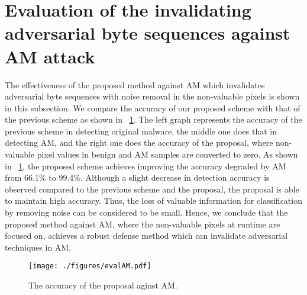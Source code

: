 \section{Evaluation of the invalidating adversarial byte sequences against AM attack}
The effectiveness of the proposed method against AM which invalidates adversarial byte sequences with noise removal in the non-valuable pixels is shown in this subsection.
We compare the accuracy of our proposed scheme with that of the previous scheme as shown in \figurename~\ref{fig:evalAM}.
The left graph represents the accuracy of the previous scheme in detecting original malware, the middle one does that in detecting AM, and the right one does the accuracy of the proposal, where non-valuable pixel values in benign and AM samples are converted to zero.
As shown in \figurename~\ref{fig:evalAM}, the proposed scheme achieves improving the accuracy degraded by AM from 66.1\% to 99.4\%.
Although a slight decrease in detection accuracy is observed compared to the previous scheme and the proposal, the proposal is able to maintain high accuracy.
Thus, the loss of valuable information for classification by removing noise can be considered to be small.
Hence, we conclude that the proposed method against AM, where the non-valuable pixels at runtime are focused on, achieves a robust defense method which can invalidate adversarial techniques in AM.

\begin{figure}[h]
 \centering
 \texttt{[image: ./figures/evalAM.pdf]}
 \caption{The accuracy of the proposal aginst AM.} 
 \label{fig:evalAM}
\end{figure}
\newpage

